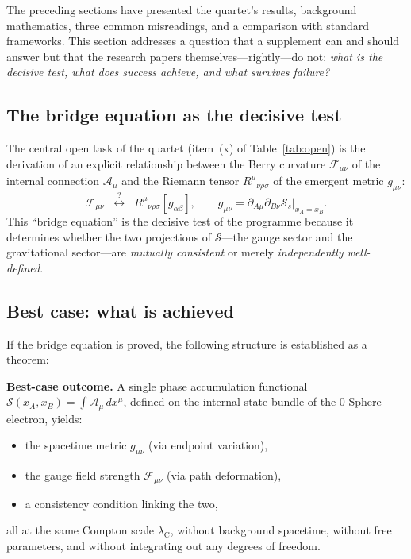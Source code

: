 \documentclass[12pt,letterpaper]{article}
\newcommand{\lambdaC}{\lambda_{\mathrm{C}}}
\newcommand{\calS}{\mathcal{S}}
\newcommand{\calA}{\mathcal{A}}
\begin{document}
The preceding sections have presented the quartet's results, background
mathematics, three common misreadings, and a comparison with standard frameworks.
This section addresses a question that a supplement can and should answer
but that the research papers themselves---rightly---do not:
\emph{what is the decisive test, what does success achieve,
and what survives failure?}

\subsection{The bridge equation as the decisive test}
\label{subsec:bridge_test}

The central open task of the quartet (item~(x) of Table~\ref{tab:open}) is the
derivation of an explicit relationship between the Berry curvature
$\mathcal{F}_{\mu\nu}$ of the internal connection $\calA_\mu$
and the Riemann tensor $R^\mu{}_{\nu\rho\sigma}$ of the emergent metric $g_{\mu\nu}$:
\begin{equation}
\mathcal{F}_{\mu\nu}
\;\;\stackrel{?}{\longleftrightarrow}\;\;
R^\mu{}_{\nu\rho\sigma}[g_{\alpha\beta}],
\qquad
g_{\mu\nu} = \partial_{A\mu}\partial_{B\nu}\calS_s\big|_{x_A=x_B}.
\label{eq:bridge}
\end{equation}
This ``bridge equation'' is the decisive test of the programme because
it determines whether the two projections of $\calS$---the gauge sector
and the gravitational sector---are \emph{mutually consistent} or merely
\emph{independently well-defined}.

\subsection{Best case: what is achieved}
\label{subsec:best_case}

If the bridge equation is proved, the following structure is established as a theorem:

\begin{mdframed}[style=chainbox]
\textbf{Best-case outcome.}
A single phase accumulation functional $\calS(x_A,x_B) = \int\calA_\mu\,dx^\mu$,
defined on the internal state bundle of the 0-Sphere electron, yields:
\begin{itemize}[leftmargin=2em, itemsep=4pt]
  \item the spacetime metric $g_{\mu\nu}$ (via endpoint variation),
  \item the gauge field strength $\mathcal{F}_{\mu\nu}$ (via path deformation),
  \item a consistency condition linking the two,
\end{itemize}
all at the same Compton scale $\lambdaC$,
without background spacetime, without free parameters,
and without integrating out any degrees of freedom.
\end{mdframed}
\end{document}
